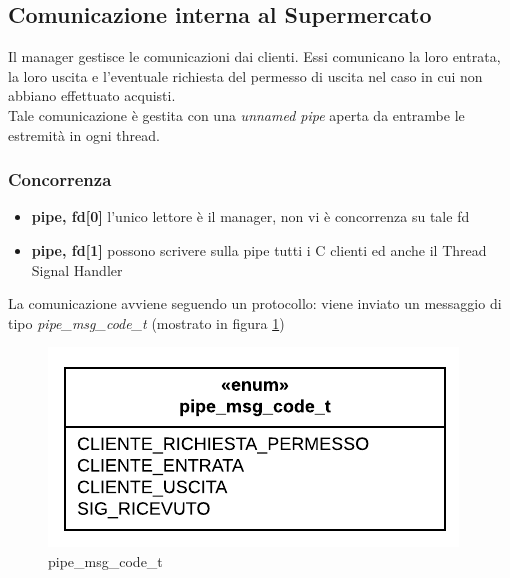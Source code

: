 \documentclass[11pt, a4paper]{article}
\begin{document}
\subsection{Comunicazione interna al Supermercato}
Il manager gestisce le comunicazioni dai clienti. Essi comunicano la loro entrata, la loro uscita e l'eventuale richiesta del permesso di uscita nel caso in cui non abbiano effettuato acquisti.\\
Tale comunicazione è gestita con una \textit{unnamed pipe} aperta da entrambe le estremità in ogni thread. 
\subsubsection{Concorrenza}
\begin{itemize}
\item \textbf{pipe, fd[0]} l'unico lettore è il manager, non vi è concorrenza su tale fd
\item \textbf{pipe, fd[1]} possono scrivere sulla pipe tutti i C clienti ed anche il Thread Signal Handler
\end{itemize}
La comunicazione avviene seguendo un protocollo: viene inviato un messaggio di tipo \textit{pipe\_msg\_code\_t} (mostrato in figura \ref{fig:pipemsg})
\begin{figure}[h]
	\centering
	\includegraphics[scale=0.8]{pipemsg.png}
	\caption{pipe\_msg\_code\_t}
	\label{fig:pipemsg}
\end{figure}
\end{document}
